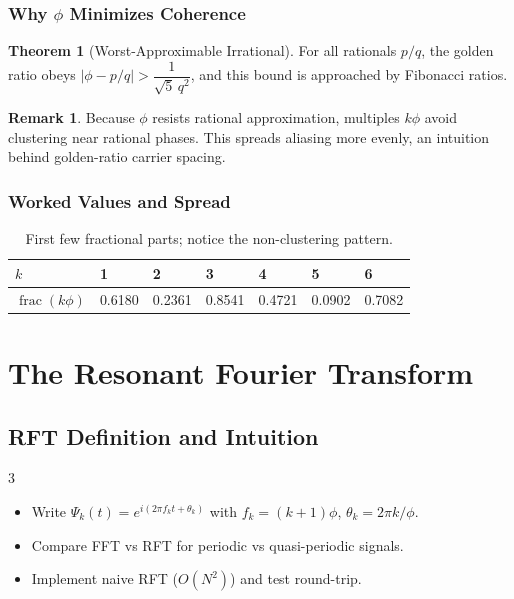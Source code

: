 \documentclass[11pt, a4paper, openany]{book}
\theoremstyle{definition}
\newtheorem{theorem}{Theorem}[chapter]
\newtheorem{remark}{Remark}[chapter]
\begin{document}
\section{Why \texorpdfstring{$\phi$}{phi} Minimizes Coherence}
\begin{theorem}[Worst-Approximable Irrational]
For all rationals $p/q$, the golden ratio obeys $\left|\phi - p/q\right| > \dfrac{1}{\sqrt{5}\,q^2}$, and this bound is approached by Fibonacci ratios.
\end{theorem}

\begin{remark}
Because $\phi$ resists rational approximation, multiples $k\phi$ avoid clustering near rational phases. This spreads aliasing more evenly, an intuition behind golden-ratio carrier spacing.
\end{remark}

\section{Worked Values and Spread}
\begin{table}[h]
\centering
\begin{tabular}{@{}lllllll@{}}\toprule
$k$ & 1 & 2 & 3 & 4 & 5 & 6 \\ \midrule
$\operatorname{frac}(k\phi)$ & 0.6180 & 0.2361 & 0.8541 & 0.4721 & 0.0902 & 0.7082 \\ \bottomrule
\end{tabular}
\caption{First few fractional parts; notice the non-clustering pattern.}
\end{table}

\part{The Resonant Fourier Transform}

\chapter{RFT Definition and Intuition}

\begin{todobox}{3}
\begin{itemize}
    \item[$\square$] Write $\Psi_k(t) = e^{i(2\pi f_k t + \theta_k)}$ with $f_k=(k+1)\phi$, $\theta_k=2\pi k/\phi$.
    \item[$\square$] Compare FFT vs RFT for periodic vs quasi-periodic signals.
    \item[$\square$] Implement naive RFT ($O(N^2)$) and test round-trip.
\end{itemize}
\end{todobox}
\end{document}
